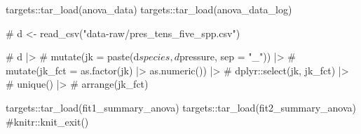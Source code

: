 \documentclass[
  11pt,
  letterpaper,
  DIV=11,
  numbers=noendperiod]{scrartcl}
\newenvironment{Shaded}{}{}
\newcommand{\CommentTok}[1]{\textcolor[rgb]{0.42,0.45,0.49}{#1}}
\newcommand{\FunctionTok}[1]{\textcolor[rgb]{0.44,0.26,0.76}{#1}}
\newcommand{\NormalTok}[1]{\textcolor[rgb]{0.14,0.16,0.18}{#1}}
\newcommand{\SpecialCharTok}[1]{\textcolor[rgb]{0.00,0.36,0.77}{#1}}
\begin{document}
\begin{Shaded}
\begin{Highlighting}[]
\NormalTok{targets}\SpecialCharTok{::}\FunctionTok{tar\_load}\NormalTok{(anova\_data)}
\NormalTok{targets}\SpecialCharTok{::}\FunctionTok{tar\_load}\NormalTok{(anova\_data\_log)}

\CommentTok{\# d \textless{}{-} read\_csv("data{-}raw/pres\_tens\_five\_spp.csv")}

\CommentTok{\# d |\textgreater{}}
\CommentTok{\#   mutate(jk = paste(d$species, d$pressure, sep = "\_")) |\textgreater{}}
\CommentTok{\#   mutate(jk\_fct = as.factor(jk) |\textgreater{} as.numeric()) |\textgreater{}}
\CommentTok{\#   dplyr::select(jk, jk\_fct) |\textgreater{}}
\CommentTok{\#   unique() |\textgreater{}}
\CommentTok{\#   arrange(jk\_fct)}
\end{Highlighting}
\end{Shaded}

\begin{Shaded}
\begin{Highlighting}[]
\NormalTok{targets}\SpecialCharTok{::}\FunctionTok{tar\_load}\NormalTok{(fit1\_summary\_anova)}
\NormalTok{targets}\SpecialCharTok{::}\FunctionTok{tar\_load}\NormalTok{(fit2\_summary\_anova)}
\CommentTok{\#knitr::knit\_exit()}
\end{Highlighting}
\end{Shaded}
\end{document}
